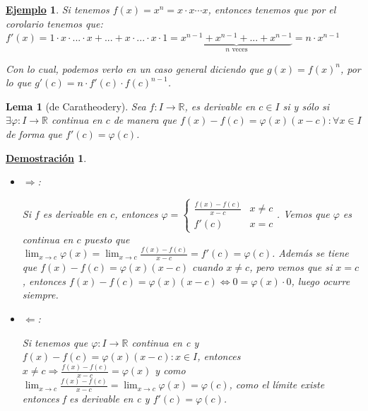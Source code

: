 \documentclass[10pt,a4paper,openright]{book}
\theoremstyle{break}
\newtheorem{lema}{Lema}[chapter]
\newtheorem*{demo}{\underline{Demostración}}
\newtheorem{ej}{\underline{Ejemplo}}[chapter]
\begin{document}
\begin{ej}
Si tenemos $f(x)=x^n= x\cdot x\cdots x$, entonces tenemos que por el corolario tenemos que: $f'(x)=1\cdot x \cdot ... \cdot x + ... + x\cdot ... \cdot x \cdot 1 = \underbrace{x^{n-1} + x^{n-1}+ ... + x^{n-1}}_{n \mbox{ veces}}= n\cdot x^{n-1}$

Con lo cual, podemos verlo en un caso general diciendo que $g(x)= f(x)^n$, por lo que $g'(c)= n\cdot f'(c)\cdot f(c)^{n-1}$.
\end{ej}

\begin{lema}[de Caratheodery]
Sea $f:I \rightarrow \mathbb R$, es derivable en $c\in I$ si y sólo si $\exists\varphi: I\rightarrow \mathbb R$ continua en $c$ de manera que $f(x)-f(c)=\varphi(x)(x-c): \forall x \in I$ de forma que $f'(c)=\varphi(c)$.
\end{lema}
\begin{demo}
\begin{itemize}
\item $\Rightarrow$:

Si $f$ es derivable en $c$, entonces $\varphi=\begin{cases} \frac{f(x)-f(c)}{x-c} & x\neq c \\ f'(c) & x=c\end{cases}$. Vemos que $\varphi$ es continua en $c$ puesto que $\lim_{x\rightarrow c}\varphi(x) = \lim_{x\rightarrow c} \frac{f(x)-f(c)}{x-c}=f'(c)=\varphi(c)$. Además se tiene que $f(x)-f(c)=\varphi(x)(x-c)$ cuando $x\neq c$, pero vemos que si $x=c$, entonces $f(x)-f(c)=\varphi(x)(x-c)\Leftrightarrow 0=\varphi(x)\cdot 0$, luego ocurre siempre.

\item $\Leftarrow$:

Si tenemos que $\varphi: I \rightarrow \mathbb R$ continua en c y $f(x)-f(c)=\varphi(x)(x-c) : x\in I$, entonces $x\neq c\Rightarrow \frac{f(x)-f(c)}{x-c}=\varphi(x)$ y como $\lim_{x\rightarrow c}\frac{f(x)-f(c)}{x-c} = \lim_{x\rightarrow c} \varphi(x)=\varphi(c)$, como el límite existe entonces f es derivable en c y $f'(c)=\varphi(c)$.
\end{itemize}
\end{demo}
\end{document}
